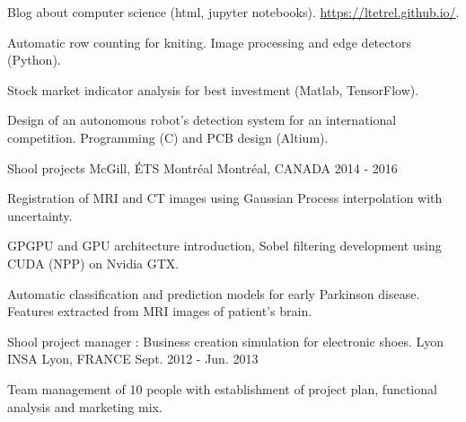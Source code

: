 


\begin{cventries}


\cventry
{} %
{} %
{} %
{} %
{ %
\vspace{-5mm}
\begin{cvitems}
\item {Blog about computer science (html, jupyter notebooks). \url{https://ltetrel.github.io/}.}
\item {Automatic row counting for kniting. Image processing and edge detectors (Python).}
\item {Stock market indicator analysis for best investment (Matlab, TensorFlow).}
\item {Design of an autonomous robot's detection system for an international competition. Programming (C) and PCB design (Altium).}
\end{cvitems}
}


\cventry
{Shool projects} %
{McGill, ÉTS Montréal} %
{Montréal, CANADA} %
{2014 - 2016} %
{ %
\begin{cvitems}
\item {Registration of MRI and CT images using Gaussian Process interpolation with uncertainty.}
\item {GPGPU and GPU architecture introduction, Sobel filtering development using CUDA (NPP) on Nvidia GTX.}
\item {Automatic classification and prediction models for early Parkinson disease. Features extracted from MRI images of patient's brain.}
\end{cvitems}
}


\cventry
{Shool project manager : Business creation simulation for electronic shoes.} %
{Lyon INSA} %
{Lyon, FRANCE} %
{Sept. 2012 - Jun. 2013} %
{ %
\begin{cvitems}
\item {Team management of 10 people with establishment of project plan, functional analysis and marketing mix.}
\end{cvitems}
}


\end{cventries}
